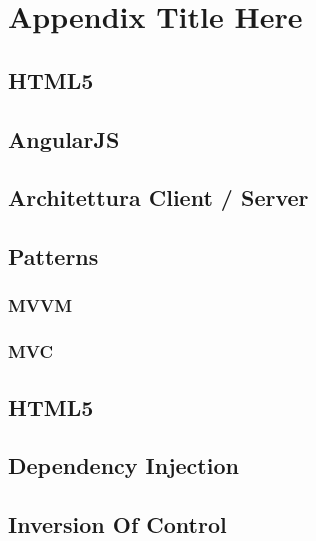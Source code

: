 
\chapter{Appendix Title Here} %

\label{AppendixA} %

\section{HTML5}
\section{AngularJS}
\section{Architettura Client / Server}
\section{Patterns}
\subsection{MVVM}
\subsection{MVC}
\section{HTML5}
\section{Dependency Injection}
\label{app:DepInj}
\section{Inversion Of Control}